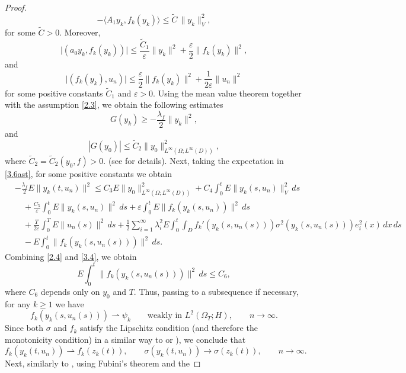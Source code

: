 \documentclass[a4paper,12pt]{article}
\numberwithin{equation}{section}
\begin{document}
\begin{proof}
\[
-\bigl\langle
A_1y_k,
f_k(y_k)
\bigr\rangle
\le
\widetilde C\,\|y_k\|_V^2,
\]
for some $\widetilde C>0$. Moreover,
\[
\bigl|
(a_0 y_k,f_k(y_k))
\bigr|
\le
\frac{\widetilde C_1}{\varepsilon}
\|y_k\|^2
+
\frac{\varepsilon}{2}
\|f_k(y_k)\|^2,
\]
and
\[
\bigl|
(f_k(y_k),u_n)
\bigr|
\le
\frac{\varepsilon}{2}
\|f_k(y_k)\|^2
+
\frac{1}{2\varepsilon}
\|u_n\|^2
\]
for some positive constants $\widetilde C_1$ and $\varepsilon>0$.
Using the mean value theorem together with
the assumption \eqref{2.3}, we obtain the following estimates
\[
G(y_k)
\ge
-\frac{\lambda_f}{2}\|y_k\|^2,
\]
and
\[
|G(y_0)|
\le
\widetilde C_2
\|y_0\|^2_{L^\infty(\Omega;L^\infty(D))},
\]
where
$ \widetilde C_2 = \widetilde C_2(y_0,f) >0.
$
(see \cite[proof of Theorem~2.1]{20} for details). Next, taking the expectation in \eqref{3.6ast}, for some positive constants we obtain
\begin{align*}
& -\frac{\lambda_f}{2}
E\|y_k(t,u_n)\|^2
\le
C_3
E\|y_0\|^2_{L^\infty(\Omega;L^\infty(D))}
+
C_4
\int_0^t
E\|y_k(s,u_n)\|_V^2\,ds \\
&\quad
+\frac{C_5}{\varepsilon}
\int_0^t
E\|y_k(s,u_n)\|^2\,ds
+
\varepsilon
\int_0^t
E\|f_k(y_k(s,u_n))\|^2\,ds
\nonumber\\
&\quad
+
\frac{T}{2\varepsilon}
\int_0^T
E\|u_n(s)\|^2\,ds
+
\frac12
\sum_{i=1}^{\infty}\lambda_i^2
E
\int_0^t
\int_D
f_k'(y_k(s,u_n(s)))
\sigma^2(y_k(s,u_n(s)))
e_i^2(x)\,dx\,ds
\nonumber \\
&\quad
-E\int_0^t
\|f_k(y_k(s,u_n(s)))\|^2\,ds.
\nonumber
\end{align*}
Combining \eqref{2.4} and \eqref{3.4}, we obtain
\begin{equation}
E\int_0^t
\|f_k(y_k(s,u_n(s)))\|^2\,ds
\le
C_6,
\label{3.6}
\end{equation}
where $C_6$ depends only on $y_0$ and $T$. Thus, passing to a subsequence if necessary, for any $k \geq 1$ we have
\begin{equation}
f_k(y_k(s,u_n(s)))
\rightharpoonup
\psi_k
\qquad
\text{weakly in }
L^2(\Omega_T;H),
\qquad
n\to\infty .
\label{3.7}
\end{equation}
Since both $\sigma$ and $f_k$ satisfy the Lipschitz condition
(and therefore the monotonicity condition) in a similar way to
\cite[Chapter~7, Theorem~7.5]{26} or
\cite[Theorem~4.24]{27}),
we conclude that
\[
f_k(y_k(t,u_n))
\rightharpoonup
f_k(z_k(t)),
\qquad
\sigma(y_k(t,u_n))
\to
\sigma(z_k(t)),
\qquad
n\to\infty .
\]
Next, similarly to \cite{20}, using Fubini's theorem and the

\end{proof}
\end{document}
